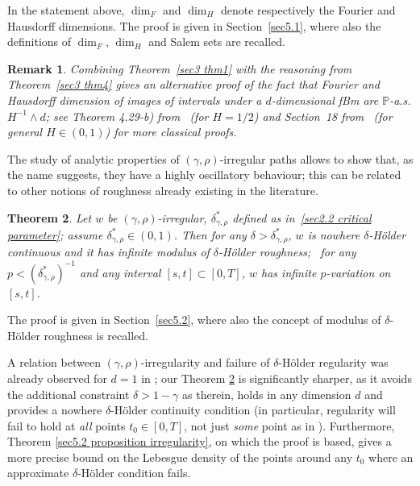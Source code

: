 \documentclass[10pt]{article}
\newtheorem{theorem}{Theorem}%
\newtheorem{remark}[theorem]{Remark}
\begin{document}
In the statement above, $\dim_F$ and $\dim_H$ denote respectively the Fourier
and Hausdorff dimensions. The proof is given in Section~\ref{sec5.1}, where
also the definitions of $\dim_F$, $\dim_H$ and Salem sets are recalled.

\begin{remark}
  Combining Theorem~\ref{sec3 thm1} with the reasoning from Theorem~\ref{sec3
  thm4} gives an alternative proof of the fact that Fourier and Hausdorff
  dimension of images of intervals under a $d$-dimensional fBm are
  $\mathbb{P}$-a.s. $H^{- 1} \wedge d$; see Theorem 4.29-b)
  from~{\cite{mortersperes}} (for $H = 1 / 2$) and Section~18
  from~{\cite{kahane}} (for general $H \in (0, 1)$) for more classical proofs.
\end{remark}

The study of analytic properties of $(\gamma, \rho)$\mbox{-}irregular paths
allows to show that, as the name suggests, they have a highly oscillatory
behaviour; this can be related to other notions of roughness already existing
in the literature.

\begin{theorem}
  \label{sec3 thm3} Let $w$ be $(\gamma, \rho)$\mbox{-}irregular,
  $\delta^{\ast}_{\gamma, \rho}$ defined as in~\eqref{sec2.2 critical
  parameter}; assume $\delta^{\ast}_{\gamma, \rho}\in (0,1)$.
  Then for any $\delta > \delta^{\ast}_{\gamma, \rho}$, $w$ is
  nowhere $\delta$\mbox{-}H\"{o}lder continuous and it has infinite modulus of
  $\delta$\mbox{-}H\"{o}lder roughness; \ for any $p < (\delta^{\ast}_{\gamma,
  \rho})^{- 1}$ and any interval $[s, t] \subset [0, T]$, $w$ has infinite
  $p$\mbox{-}variation on $[s, t]$.
\end{theorem}

The proof is given in Section~\ref{sec5.2}, where also the concept of modulus
of $\delta$\mbox{-}H\"{o}lder roughness is recalled.

A relation between $(\gamma,\rho)$-irregularity and failure of $\delta$-H\"older regularity was already observed for $d=1$ in \cite[Theorem 1.5]{choukgubinelli1}; our Theorem \ref{sec3 thm3} is significantly sharper, as it avoids the additional constraint $\delta>1-\gamma$ as therein, holds in any dimension $d$ and provides a nowhere $\delta$\mbox{-}H\"{o}lder continuity condition (in particular, regularity will fail to hold at \textit{all} points $t_0\in [0,T]$, not just \textit{some} point as in \cite[Theorem 1.5]{choukgubinelli1}). Furthermore, Theorem \ref{sec5.2 proposition irregularity}, on which the proof is based, gives a more precise bound on the Lebesgue density of the points around any $t_0$ where an approximate $\delta$-H\"older condition fails.
\end{document}
